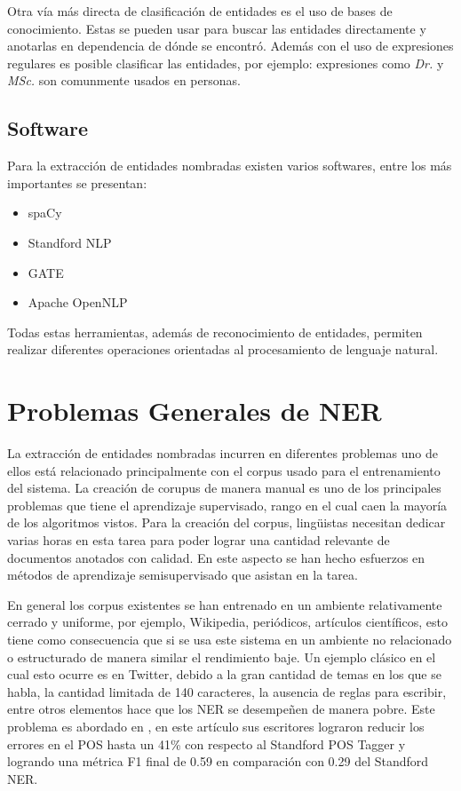 \documentclass[runningheads]{llncs}
\begin{document}
Otra vía más directa de clasificación de entidades es el uso de bases de conocimiento. Estas se pueden usar para buscar las entidades directamente y anotarlas en dependencia de dónde se encontró. Además con el uso de expresiones regulares es posible clasificar las entidades, por ejemplo: expresiones como \emph{Dr.} y \emph{MSc.} son comunmente usados en personas.

\subsection{Software}

Para la extracción de entidades nombradas existen varios softwares, entre los más importantes se presentan:

\begin{itemize}

\item spaCy \cite{spacy_nlp}
\item Standford NLP \cite{standford_nlp}
\item GATE \cite{gate_nlp}
\item Apache OpenNLP \cite{open_nlp}

\end{itemize}

Todas estas herramientas, además de reconocimiento de entidades, permiten realizar diferentes operaciones orientadas al procesamiento de lenguaje natural.

\section{Problemas Generales de NER}

La extracción de entidades nombradas incurren en diferentes problemas uno de ellos está relacionado principalmente con el corpus usado para el entrenamiento del sistema. La creación de corupus de manera manual es uno de los principales problemas que tiene el aprendizaje supervisado, rango en el cual caen la mayoría de los algoritmos vistos. Para la creación del corpus, lingüistas necesitan dedicar varias horas en esta tarea para poder lograr una cantidad relevante de documentos anotados con calidad. En este aspecto se han hecho esfuerzos en métodos de aprendizaje semisupervisado que asistan en la tarea. %

En general los corpus existentes se han entrenado en un ambiente relativamente cerrado y uniforme, por ejemplo, Wikipedia, periódicos, artículos científicos, esto tiene como consecuencia que si se usa este sistema en un ambiente no relacionado o estructurado de manera similar el rendimiento baje. Un ejemplo clásico en el cual esto ocurre es en Twitter, debido a la gran cantidad de temas en los que se habla, la cantidad limitada de 140 caracteres, la ausencia de reglas para escribir,  entre otros elementos hace que los NER se desempeñen de manera pobre. Este problema es abordado en \cite{tweeter}, en este artículo sus escritores lograron reducir los errores en el POS hasta un 41\% con respecto al Standford POS Tagger y logrando una métrica F1 final de 0.59 en comparación con 0.29 del Standford NER. 
\end{document}
